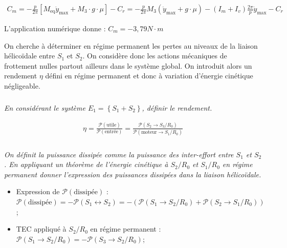 \documentclass[10pt,fleqn]{article} %
\begin{document}
\begin{multicols}{2}
\ifprof\begin{corrige}
\begin{align*}
C_m=-\frac{p}{2\pi}\left[M_{\text{eq}}\ddot{y}_{\text{max}}+M_3\cdot g\cdot \mu\right]-C_r
=-\frac{p}{2\pi}M_3\left(\ddot{y}_{\text{max}}+g\cdot \mu\right)-\left(I_m+I_v\right)\frac{2\pi}{p}\ddot{y}_{\text{max}}-C_r
\end{align*}

L'application numérique donne  : $C_m=-3,79N\cdot m$
\end{corrige}\else\fi




On cherche à déterminer en régime permanent les pertes au niveaux de la liaison hélicoïdale entre $S_1$ et $S_2$. On considère donc les actions mécaniques de frottement nulles partout ailleurs dans le système global. On introduit alors un rendement $\eta$ défini en régime permanent et donc à variation d'énergie cinétique négligeable.

\subparagraph{}\textit{En considérant le système $E_1=\left\{S_1+S_2\right\}$, définir le rendement.}

\ifprof\begin{corrige}
\begin{align*}
\eta=\frac{\mathcal{P}(\text{utile})}{\mathcal{P}(\text{entrée})}=\frac{\mathcal{P}(S_2\to S_3/R_0)}{\mathcal{P}(\text{moteur}\to S_1/R_0)}
\end{align*}
\end{corrige}\else\fi

\subparagraph{}\textit{On définit la puissance dissipée comme la puissance des inter-effort entre $S_1$ et $S_2$. En appliquant un théorème de l'énergie cinétique à $S_2/R_0$ et $S_1/R_0$ en régime permanent donner l'expression des puissances dissipées dans la liaison hélicoïdale.}

\ifprof\begin{corrige}
\begin{itemize}
\item Expression de $\mathcal{P}(\text{dissipée})$ :
$\mathcal{P}(\text{dissipée})=-\mathcal{P}(S_1\leftrightarrow S_2)=-\left(\mathcal{P}(S_1\to S_2/R_0)+\mathcal{P}(S_2\to S_1/R_0)\right)$;
\item TEC appliqué à $S_2/R_0$ en régime permanent : 
$\mathcal{P}(S_1\to S_2/R_0)=-\mathcal{P}(S_3\to S_2/R_0)$;


\end{itemize}
\end{corrige}
\end{multicols}
\end{document}

